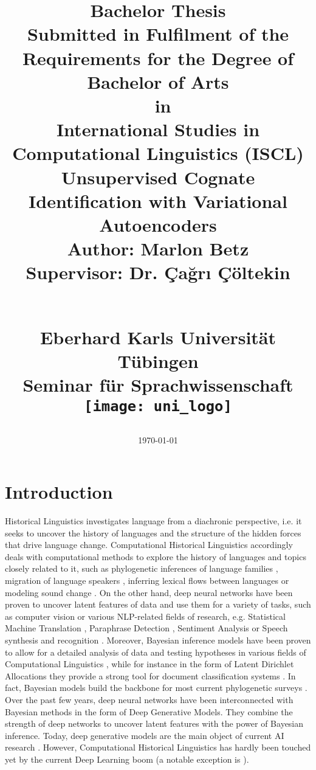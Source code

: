 \documentclass[6pt]{article}
\title{
	{Bachelor Thesis}\\
	{\normalsize Submitted in Fulfilment of the Requirements for the Degree of} \\ %
{\large Bachelor of Arts} \\ %
	 {\small in} \\  %
	 {\large  International Studies in Computational Linguistics (ISCL) } \\ \vspace*{1cm} \hline \vspace*{1cm} 
	{\Huge \textbf{Unsupervised Cognate Identification with Variational Autoencoders}}\\ \vspace*{1cm} \hline \vspace*{1cm}
	{\LARGE  Author: Marlon Betz }  \\
	{\LARGE  Supervisor: Dr. Çağrı Çöltekin }  \\
\date{\today} \\
\vspace*{2cm}
	{\Large Eberhard Karls Universität Tübingen}\\
	{\large Seminar für Sprachwissenschaft} \\
	\vspace*{1cm}
	{\texttt{[image: uni\_logo]}}
}
\begin{document}
\thispagestyle{empty}
\maketitle
\thispagestyle{empty}
\newpage

 

\newpage
\newpage

\tableofcontents
\thispagestyle{empty}
\newpage
{}
\setcounter{page}{1}

\section{Introduction}

Historical Linguistics investigates language from a diachronic perspective, i.e. it seeks to uncover the history of languages and the structure of the hidden forces that drive language change.  Computational Historical Linguistics accordingly deals with computational methods to explore the history of languages and topics closely related to it, such as phylogenetic inferences of language families \citep{bouckaert2012mapping}, migration of language speakers \citep{gray2009language}, inferring lexical flows between languages \citep{dellert2015uralic} or modeling sound change \citep{bouchard2013automated}.  
On the other hand, deep neural networks have been proven to uncover latent features of data and use them for a variety of tasks, such as computer vision or various NLP-related fields of research, e.g. Statistical Machine Translation \citep{zhang2014bilingually,lauly2014autoencoder}, Paraphrase Detection \citep{socher2011dynamic}, Sentiment Analysis \citep{socher2013recursive} or Speech synthesis  and recognition \citep{hinton2012deep,zen2014deep}. 
Moreover, Bayesian inference models have been proven to allow for a detailed analysis of data and testing hypotheses in various fields of Computational Linguistics \citep{crocker2010computational,chater2006probabilistic}, while for instance in the form of Latent Dirichlet Allocations they provide a strong tool for document classification systems \citep{blei2003latent}. In fact, Bayesian models build the backbone for most current phylogenetic surveys \citep{gray2009language,bouckaert2012mapping,bouchard2013automated}.
Over the past few years, deep neural networks have been interconnected with Bayesian methods in the form of Deep Generative Models. They combine the strength of deep networks to uncover latent features with the power of Bayesian inference. Today, deep generative models are the main object of current AI research \citep[p. 654]{Goodfellow-et-al-2016-Book}. 
 However, Computational Historical Linguistics has hardly been touched yet by the current Deep Learning boom (a notable exception is \cite{rama2016siamese}). 
\end{document}

